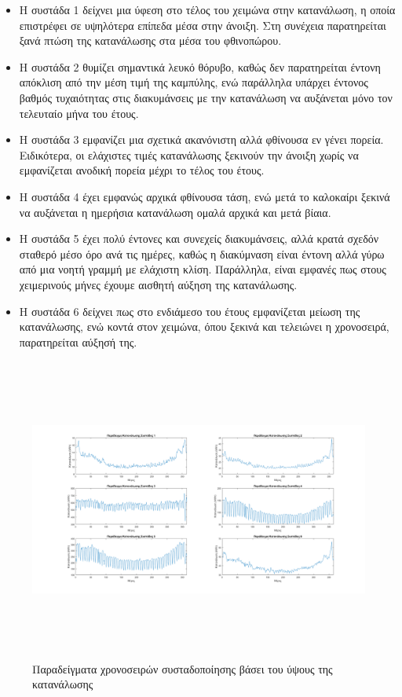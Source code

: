 \begin{itemize}
\item Η συστάδα 1 δείχνει μια ύφεση στο τέλος του χειμώνα στην κατανάλωση, η οποία επιστρέφει σε υψηλότερα επίπεδα μέσα στην άνοιξη. Στη συνέχεια παρατηρείται ξανά πτώση της κατανάλωσης στα μέσα του φθινοπώρου.
\item Η συστάδα 2 θυμίζει σημαντικά λευκό θόρυβο, καθώς δεν παρατηρείται έντονη απόκλιση από την μέση τιμή της καμπύλης, ενώ παράλληλα υπάρχει έντονος βαθμός τυχαιότητας στις διακυμάνσεις με την κατανάλωση να αυξάνεται μόνο τον τελευταίο μήνα του έτους.
\item Η συστάδα 3 εμφανίζει μια σχετικά ακανόνιστη αλλά φθίνουσα εν γένει πορεία. Ειδικότερα, οι ελάχιστες τιμές κατανάλωσης ξεκινούν την άνοιξη χωρίς να εμφανίζεται ανοδική πορεία μέχρι το τέλος του έτους.
\item Η συστάδα 4 έχει εμφανώς αρχικά φθίνουσα τάση, ενώ μετά το καλοκαίρι ξεκινά να αυξάνεται η ημερήσια κατανάλωση ομαλά αρχικά και μετά βίαια.
\item Η συστάδα 5 έχει πολύ έντονες και συνεχείς διακυμάνσεις, αλλά κρατά σχεδόν σταθερό μέσο όρο ανά τις ημέρες, καθώς η διακύμναση είναι έντονη αλλά γύρω από μια νοητή γραμμή με ελάχιστη κλίση. Παράλληλα, είναι εμφανές πως στους χειμερινούς μήνες έχουμε αισθητή αύξηση της κατανάλωσης.
\item Η συστάδα 6 δείχνει πως στο ενδιάμεσο του έτους εμφανίζεται μείωση της κατανάλωσης, ενώ κοντά στον χειμώνα, όπου ξεκινά και τελειώνει η χρονοσειρά, παρατηρείται αύξησή της. 
\end{itemize}
\begin{figure}[ht!]
\centering
\includegraphics[width=180mm, height=100mm]{../../plots/Consumption_Analysis/gr_cluster_cons_level.png}
\caption{Παραδείγματα χρονοσειρών συσταδοποίησης βάσει του ύψους της κατανάλωσης}
\label{fig:clusterform}
\end{figure}
